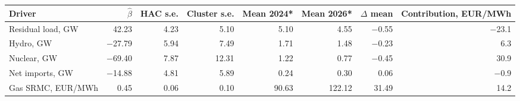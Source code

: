 \begin{tabular}{lrrrrrrr}
\toprule
Driver & $\hat\beta$ & HAC s.e. & Cluster s.e. & Mean 2024* & Mean 2026* & $\Delta$ mean & Contribution, EUR/MWh \\
\midrule
Residual load, GW & 42.23 & 4.23 & 5.10 & 5.10 & 4.55 & $-$0.55 & $-$23.1 \\
Hydro, GW & $-$27.79 & 5.94 & 7.49 & 1.71 & 1.48 & $-$0.23 & 6.3 \\
Nuclear, GW & $-$69.40 & 7.87 & 12.31 & 1.22 & 0.77 & $-$0.45 & 30.9 \\
Net imports, GW & $-$14.88 & 4.81 & 5.89 & 0.24 & 0.30 & 0.06 & $-$0.9 \\
Gas SRMC, EUR/MWh & 0.45 & 0.06 & 0.10 & 90.63 & 122.12 & 31.49 & 14.2 \\
\bottomrule
\end{tabular}
